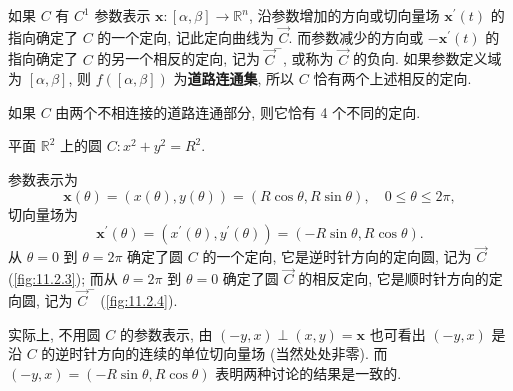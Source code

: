 如果 $C$ 有 $C^{1}$ 参数表示 $\boldsymbol{x}:[\alpha, \beta] \to \mathbb{R}^{n}$, 沿参数增加的方向或切向量场 $\boldsymbol{x}^{\prime}(t)$ 的指向确定了 $C$ 的一个定向, 记此定向曲线为 $\overrightarrow{C}$. 而参数减少的方向或 $-\boldsymbol{x}^{\prime}(t)$ 的指向确定了 $C$ 的另一个相反的定向, 记为 $\overrightarrow{C}^{-}$, 或称为 $\overrightarrow{C}$ 的负向. 如果参数定义域为 $[\alpha, \beta]$, 则 $f([\alpha, \beta])$ 为\textbf{道路连通集}, 所以 $C$ 恰有两个上述相反的定向.

如果 $C$ 由两个不相连接的道路连通部分, 则它恰有 4 个不同的定向.

\begin{example}\label{ex:11.2.1}
平面 $\mathbb{R}^{2}$ 上的圆 $C: x^{2}+y^{2}=R^{2}$.
\end{example}

参数表示为
\[
  \boldsymbol{x}(\theta)=(x(\theta), y(\theta))=(R \cos \theta, R \sin \theta), \quad 0 \leqslant \theta \leqslant 2 \pi,
\]
切向量场为
\[
  \boldsymbol{x}^{\prime}(\theta)=\left(x^{\prime}(\theta), y^{\prime}(\theta)\right)=(-R \sin \theta, R \cos \theta).
\]
从 $\theta=0$ 到 $\theta=2 \pi$ 确定了圆 $C$ 的一个定向, 它是逆时针方向的定向圆, 记为 $\overrightarrow{C}$ (\cref{fig:11.2.3}); 而从 $\theta=2 \pi$ 到 $\theta=0$ 确定了圆 $\overrightarrow{C}$ 的相反定向, 它是顺时针方向的定向圆, 记为 $\overrightarrow{C}^{-}$ (\cref{fig:11.2.4}).

实际上, 不用圆 $C$ 的参数表示, 由 $(-y, x) \perp(x, y)=\boldsymbol{x}$ 也可看出 $(-y, x)$ 是沿 $C$ 的逆时针方向的连续的单位切向量场 (当然处处非零). 而 $(-y, x)=(-R \sin \theta, R \cos \theta)$ 表明两种讨论的结果是一致的.

